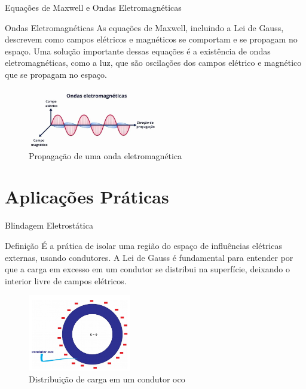 \documentclass{beamer}
\begin{document}
  \begin{frame}{Equações de Maxwell e Ondas Eletromagnéticas}
  \begin{block}{Ondas Eletromagnéticas}
  As equações de Maxwell, incluindo a Lei de Gauss, descrevem como campos elétricos e magnéticos se comportam e se propagam no espaço. Uma solução importante dessas equações é a existência de ondas eletromagnéticas, como a luz, que são oscilações dos campos elétrico e magnético que se propagam no espaço.
  \end{block}
  
  \begin{figure}
  \centering
  \includegraphics[width=0.5\textwidth]{images/onda_eletromagnetica.png}
  \caption{Propagação de uma onda eletromagnética}
  \end{figure}
  
  \end{frame}
  
  \section{Aplicações Práticas}
  
  \begin{frame}{Blindagem Eletrostática}
  \begin{block}{Definição}
  É a prática de isolar uma região do espaço de influências elétricas externas, usando condutores. A Lei de Gauss é fundamental para entender por que a carga em excesso em um condutor se distribui na superfície, deixando o interior livre de campos elétricos.
  \end{block}
  
  \begin{figure}
  \centering
  \includegraphics[width=0.4\textwidth]{images/blindagem_eletrostatica.png}
  \caption{Distribuição de carga em um condutor oco}
  \end{figure}
  
  \end{frame}
  
\end{document}

